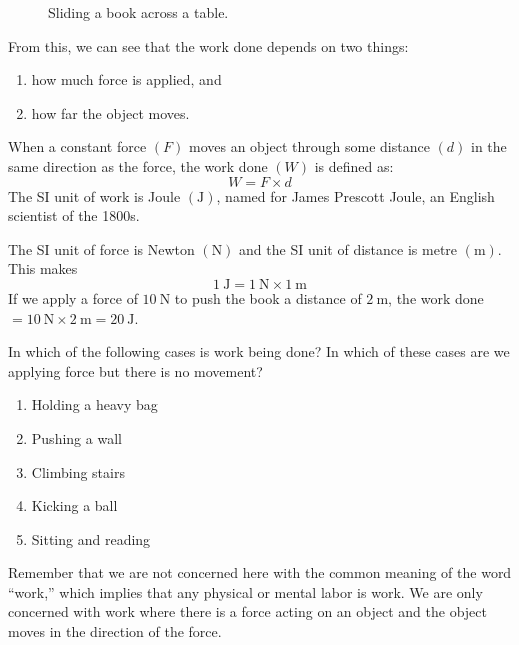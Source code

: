\documentclass{xtufte-handout}
\begin{document}
\begin{figure}
  \caption{Sliding a book across a table.}
  \label{fig:slidingBook}
\end{figure}
From this, we can see that the work done depends on two things:
\begin{enumerate}
\item how much force is applied, and
\item how far the object moves.
\end{enumerate}
When a constant force $(F)$ moves an object through some distance $(d)$ in the same direction as the force, the work done $(W)$ is defined as:
\begin{equation}\label{eq:workDef}
W = F \times d
\end{equation}
The SI unit of work is Joule $(\unit\joule)$, named for James Prescott Joule, an English scientist of the 1800s.

The SI unit of force is Newton $(\unit\newton)$ and the SI unit of distance is metre $(\unit\metre)$. This makes
\begin{equation}
  1~ \unit\joule = 1~ \unit\newton\times 1~\unit\metre  
\end{equation}
 If we apply a force of $10~\unit\newton$ to push the book a distance of $2~\unit\metre$, the work done $= 10~\unit\newton \times 2~\unit\metre = 20~\unit\joule$.

 In which of the following cases is work being done? In which of these cases are we applying force but there is no movement?
\begin{enumerate}
\item Holding a heavy bag 
\item Pushing a wall 
\item Climbing stairs 
\item Kicking a ball 
\item Sitting and reading
\end{enumerate}
Remember that we are not concerned here with the common meaning of the word ``work,” which implies that any physical or mental labor is work. We are only concerned with work where there is a force acting on an object and the object moves in the direction of the force.
\end{document}
